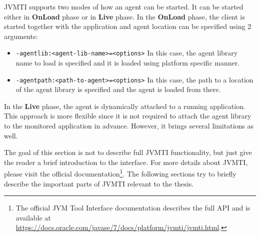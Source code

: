 JVMTI supports two modes of how an agent can be started. It can be started either in \textbf{OnLoad} phase or in \textbf{Live} phase. In the \textbf{OnLoad} phase, the client is started together with the application and agent location can be specified using 2 arguments:
\begin{itemize}
	\item \texttt{-agentlib:<agent-lib-name>=<options>} \newline
	In this case, the agent library name to load is specified and it is loaded using platform specific manner.
	\item \texttt{-agentpath:<path-to-agent>=<options>} \newline
	In this case, the path to a location of the agent library is specified and the agent is loaded from there.
\end{itemize}

In the \textbf{Live} phase, the agent is dynamically attached to a running application. This approach is more flexible since it is not required to attach the agent library to the monitored application in advance. However, it brings several limitations as well.

The goal of this section is not to describe full JVMTI functionality, but just give the reader a brief introduction to the interface. For more details about JVMTI, please visit the official documentation\footnote{The official JVM Tool Interface documentation describes the full API and is available at \url{https://docs.oracle.com/javase/7/docs/platform/jvmti/jvmti.html}.}. The following sections try to briefly describe the important parts of JVMTI relevant to the thesis.

